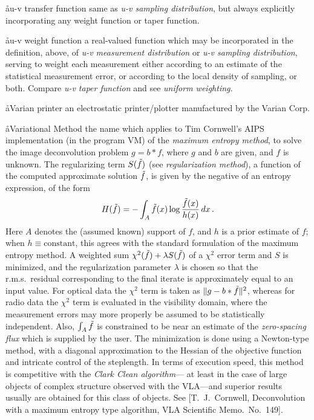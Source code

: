 \aa{u-v transfer function}
same as {\it u-v sampling distribution}\/, but always
explicitly incorporating any \uv weight function or
\uv taper function.

\aa{u-v weight function}
a real-valued function which may be incorporated in the definition, above,
of {\it u-v measurement distribution} or {\it u-v sampling distribution}\/,
serving to
weight each measurement either according to an estimate of the statistical
measurement error,
or according to the local density of sampling, or both.
Compare {\it u-v taper function} and see {\it uniform weighting.}

\aa{Varian printer}
an electrostatic printer\slash plotter manufactured by the Varian Corp.

\aa{Variational Method}
the name which applies to Tim Cornwell's AIPS implementation
(in the program VM) of the {\it maximum entropy method},
to solve the image deconvolution problem $g=b\ast f$,
where $g$ and $b$ are given, and $f$ is unknown.
The regularizing term $S(\tilde f)$ (see {\it regularization method}\/),
a function of the computed approximate solution $\tilde f$,
is given by the negative of an entropy expression, of the form
$$H(\tilde f)=-\int_A\tilde f(x)\log{\tilde f(x)\over h(x)}\,dx\,.$$
Here $A$ denotes the (assumed known) support of $f$,
and $h$ is a prior estimate of $f$;
when $h\equiv\text{constant}$, this agrees with the standard formulation
of the maximum entropy method.
A weighted sum $\chi^2(\tilde f)+\lambda S(\tilde f)$
of a $\chi^2$ error term and $S$ is minimized,
and the regularization parameter $\lambda$ is chosen so that the
r.m.s.\ residual corresponding to the final iterate
is approximately equal to an input value.
For optical data the $\chi^2$ term is taken as $\|g-b\ast\tilde f\|^2$,
whereas for radio data the $\chi^2$ term is evaluated
in the visibility domain, where the measurement errors
may more properly be assumed to be statistically independent.
Also, $\int_A\tilde f$ is constrained to be near
an estimate of the {\it zero-spacing flux} which is supplied by the user.
The minimization is done using a Newton-type method, with
a diagonal approximation to the Hessian of the objective function
and intricate control of the steplength.
In terms of execution speed, this method is competitive
with the {\it Clark Clean algorithm}\/---%
at least in the case of large objects of complex structure observed
with the VLA---and superior results usually are obtained
for this class of objects.
See [T.~J.~Cornwell, Deconvolution with a maximum entropy type
algorithm, VLA Scientific Memo.\ No.~149].

